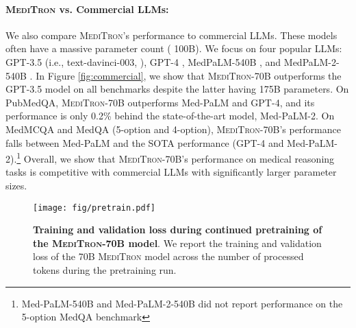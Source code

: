 \documentclass{article}
\newcommand{\mtron}{\textsc{MediTron}\xspace}
\newcommand{\mtronb}{\textsc{MediTron-70B}\xspace}
\begin{document}
\paragraph{\mtron vs. Commercial LLMs:}
We also compare \mtron's performance to commercial LLMs. These models often have a massive parameter count ( 100B). We focus on four popular LLMs: GPT-3.5 (i.e., text-davinci-003, \citep{ouyang2022training}), GPT-4 \citep{openai2023gpt4, nori2023capabilities}, MedPaLM-540B \citep{medpalm}, and MedPaLM-2-540B \citep{medpalm2}. In Figure \ref{fig:commercial}, we show that \mtronb outperforms the GPT-3.5 model on all benchmarks despite the latter having 175B parameters. On PubMedQA, \mtronb outperforms Med-PaLM and GPT-4, and its performance is only 0.2\% behind the state-of-the-art model, Med-PaLM-2. On MedMCQA and MedQA (5-option and 4-option), \mtronb's performance falls between Med-PaLM and the SOTA performance (GPT-4 and Med-PaLM-2).\footnote{Med-PaLM-540B and Med-PaLM-2-540B did not report performance on the 5-option MedQA benchmark} Overall, we show that \mtronb's performance on medical reasoning tasks is competitive with commercial LLMs with significantly larger parameter sizes.


\begin{figure}[t]
    \centering
    \texttt{[image: fig/pretrain.pdf]}
    \caption{\textbf{Training and validation loss during continued pretraining of the \mtronb model}. We report the training and validation loss of the 70B \mtron model across the number of processed tokens during the pretraining run.}
    \label{fig:pretrain}
\end{figure}
\end{document}
